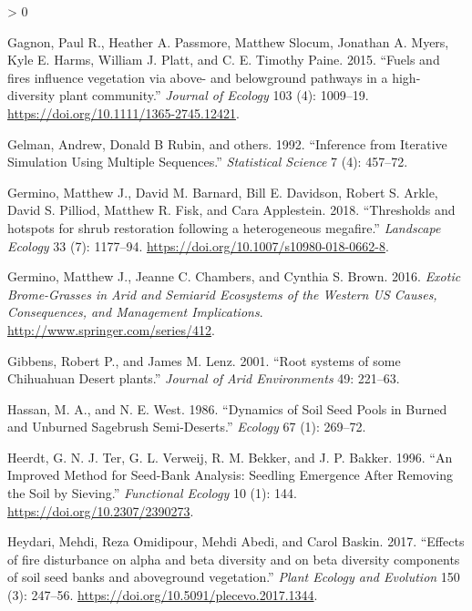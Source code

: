 \documentclass[
  12pt,
]{article}
\newlength{\cslhangindent}
\newenvironment{CSLReferences}[2] %
 {%
  \setlength{\parindent}{0pt}
  \ifodd #1 \everypar{\setlength{\hangindent}{\cslhangindent}}\ignorespaces\fi
  \ifnum #2 > 0
  \setlength{\parskip}{#2\baselineskip}
  \fi
 }%
 {}
\begin{document}
\begin{CSLReferences}{1}{0}
\leavevmode\hypertarget{ref-Gagnon2015}{}%
Gagnon, Paul R., Heather A. Passmore, Matthew Slocum, Jonathan A. Myers,
Kyle E. Harms, William J. Platt, and C. E. Timothy Paine. 2015.
{``{Fuels and fires influence vegetation via above- and belowground
pathways in a high-diversity plant community}.''} \emph{Journal of
Ecology} 103 (4): 1009--19.
\url{https://doi.org/10.1111/1365-2745.12421}.

\leavevmode\hypertarget{ref-Gelman1992}{}%
Gelman, Andrew, Donald B Rubin, and others. 1992. {``Inference from
Iterative Simulation Using Multiple Sequences.''} \emph{Statistical
Science} 7 (4): 457--72.

\leavevmode\hypertarget{ref-Germino2018}{}%
Germino, Matthew J., David M. Barnard, Bill E. Davidson, Robert S.
Arkle, David S. Pilliod, Matthew R. Fisk, and Cara Applestein. 2018.
{``{Thresholds and hotspots for shrub restoration following a
heterogeneous megafire}.''} \emph{Landscape Ecology} 33 (7): 1177--94.
\url{https://doi.org/10.1007/s10980-018-0662-8}.

\leavevmode\hypertarget{ref-Germino2016}{}%
Germino, Matthew J., Jeanne C. Chambers, and Cynthia S. Brown. 2016.
\emph{{Exotic Brome-Grasses in Arid and Semiarid Ecosystems of the
Western US Causes, Consequences, and Management Implications}}.
\url{http://www.springer.com/series/412}.

\leavevmode\hypertarget{ref-Gibbens2001}{}%
Gibbens, Robert P., and James M. Lenz. 2001. {``{Root systems of some
Chihuahuan Desert plants}.''} \emph{Journal of Arid Environments} 49:
221--63.

\leavevmode\hypertarget{ref-Hassan1986}{}%
Hassan, M. A., and N. E. West. 1986. {``{Dynamics of Soil Seed Pools in
Burned and Unburned Sagebrush Semi-Deserts}.''} \emph{Ecology} 67 (1):
269--72.

\leavevmode\hypertarget{ref-Heerdt1996}{}%
Heerdt, G. N. J. Ter, G. L. Verweij, R. M. Bekker, and J. P. Bakker.
1996. {``{An Improved Method for Seed-Bank Analysis: Seedling Emergence
After Removing the Soil by Sieving}.''} \emph{Functional Ecology} 10
(1): 144. \url{https://doi.org/10.2307/2390273}.

\leavevmode\hypertarget{ref-Heydari2017}{}%
Heydari, Mehdi, Reza Omidipour, Mehdi Abedi, and Carol Baskin. 2017.
{``{Effects of fire disturbance on alpha and beta diversity and on beta
diversity components of soil seed banks and aboveground vegetation}.''}
\emph{Plant Ecology and Evolution} 150 (3): 247--56.
\url{https://doi.org/10.5091/plecevo.2017.1344}.


\end{CSLReferences}
\end{document}
